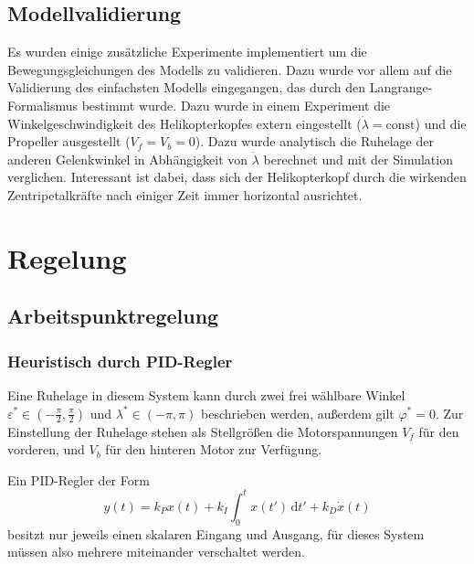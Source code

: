 \documentclass[10pt,twocolumn]{article}
\begin{document}
	\subsection{Modellvalidierung}

	Es wurden einige zusätzliche Experimente implementiert um die Bewegungsgleichungen des Modells zu validieren. Dazu wurde vor allem auf die Validierung des einfachsten Modells eingegangen, das durch den Langrange-Formalismus bestimmt wurde.
	Dazu wurde in einem Experiment die Winkelgeschwindigkeit des Helikopterkopfes extern eingestellt ($\dot{\lambda} = \mathrm{const}$) und die Propeller ausgestellt ($V_f = V_b = 0$).
	Dazu wurde analytisch die Ruhelage der anderen Gelenkwinkel in Abhängigkeit von $\dot{\lambda}$ berechnet und mit der Simulation verglichen.
	Interessant ist dabei, dass sich der Helikopterkopf durch die wirkenden Zentripetalkräfte nach einiger Zeit immer horizontal ausrichtet.
	
	\section{Regelung}
	\subsection{Arbeitspunktregelung}
	\subsubsection{Heuristisch durch PID-Regler}
	Eine Ruhelage in diesem System kann durch zwei frei wählbare Winkel \(\varepsilon^* \in (-\frac{\pi}{2}, \frac{\pi}{2})\) und \(\lambda^* \in (-\pi, \pi)\) beschrieben werden, außerdem gilt \(\varphi^*=0\).
	Zur Einstellung der Ruhelage stehen als Stellgrößen die Motorspannungen \(V_f\) für den vorderen, und \(V_b\) für den hinteren Motor zur Verfügung.

	Ein PID-Regler der Form
	\[
		y(t) = k_P x(t) + k_I \int_0^t x(t') \, \mathrm{d}t' +  k_D \dot{x}(t)
	\]
	besitzt nur jeweils einen skalaren Eingang und Ausgang, für dieses System müssen also mehrere miteinander verschaltet werden.
	
\end{document}
